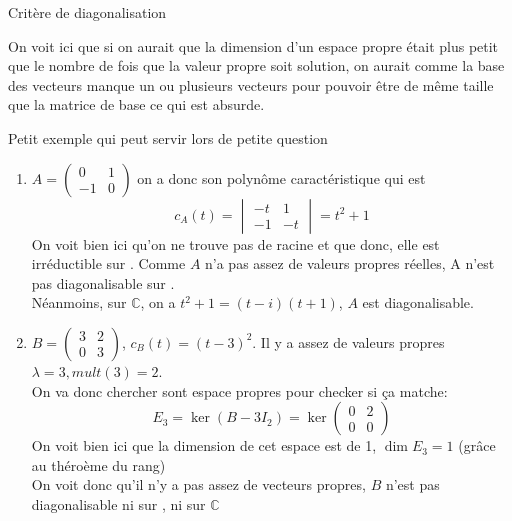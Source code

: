 \begin{parag}{Critère de diagonalisation}
\begin{theoreme}
    \end{theoreme}
    \begin{framedremark}
            On voit ici que si on aurait que la dimension d'un espace propre était plus petit que le nombre de fois que la valeur propre soit solution, on aurait comme la base des vecteurs manque un ou plusieurs vecteurs pour pouvoir être de même taille que la matrice de base ce qui est absurde.
        \end{framedremark}
        \begin{subparag}{Petit exemple qui peut servir lors de petite question}
        \begin{enumerate}
            \item $A = \begin{pmatrix}
                0 & 1\\ -1 & 0
            \end{pmatrix}$ on a donc son polynôme caractéristique qui est 
            \[c_A(t) = \begin{vmatrix}
                -t & 1\\ -1 & -t
            \end{vmatrix} = t^2 + 1\]
            On voit bien ici qu'on ne trouve pas de racine et que donc, elle est irréductible sur \R. Comme $A$ n'a pas assez de valeurs propres réelles, A n'est pas diagonalisable sur \R.
            \\
            Néanmoins, sur $\mathbb{C}$, on a $t^2 + 1 = (t-i)(t+1)$, $A$ est diagonalisable.
            \item $B = \begin{pmatrix}
                3 & 2\\0 & 3
            \end{pmatrix}$, $c_B(t) = (t-3)^2$. Il y a assez de valeurs propres $\lambda = 3, mult(3) = 2$.
            \\
            On va donc chercher sont espace propres pour checker si ça matche:
            \[E_3 =\ker(B - 3I_2) =  \ker \begin{pmatrix}
                0 & 2\\ 0 & 0
            \end{pmatrix}\]
            On voit bien ici que la dimension de cet espace est de 1, $\dim E_3 = 1$ (grâce au théroème du rang)\\
            On voit donc qu'il n'y a pas assez de vecteurs propres, $B$ n'est pas diagonalisable ni sur \R, ni sur $\mathbb{C}$
        \end{enumerate}
    
            
        \end{subparag}
\end{parag}

